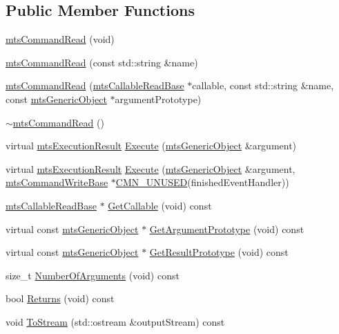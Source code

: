 \subsection*{Public Member Functions}
\begin{DoxyCompactItemize}
\item 
\hyperlink{classmts_command_read_ab7638c37f1324419aecfd630c1956242}{mts\+Command\+Read} (void)
\item 
\hyperlink{classmts_command_read_a3284698af9e589017a99d01c106d134f}{mts\+Command\+Read} (const std\+::string \&name)
\item 
\hyperlink{classmts_command_read_ad1fd48cbf7eef09ec6b6ac949cf07266}{mts\+Command\+Read} (\hyperlink{classmts_callable_read_base}{mts\+Callable\+Read\+Base} $\ast$callable, const std\+::string \&name, const \hyperlink{classmts_generic_object}{mts\+Generic\+Object} $\ast$argument\+Prototype)
\item 
\hyperlink{classmts_command_read_a0bec5b8aab94dc7bc4bd0334592b773a}{$\sim$mts\+Command\+Read} ()
\item 
virtual \hyperlink{classmts_execution_result}{mts\+Execution\+Result} \hyperlink{classmts_command_read_ac7186f6e12418c551c483105719a8a38}{Execute} (\hyperlink{classmts_generic_object}{mts\+Generic\+Object} \&argument)
\item 
virtual \hyperlink{classmts_execution_result}{mts\+Execution\+Result} \hyperlink{classmts_command_read_ae5df5d5a093d4c465b3a6d3092755305}{Execute} (\hyperlink{classmts_generic_object}{mts\+Generic\+Object} \&argument, \hyperlink{classmts_command_write_base}{mts\+Command\+Write\+Base} $\ast$\hyperlink{cmn_portability_8h_a021894e2626935fa2305434b1e893ff6}{C\+M\+N\+\_\+\+U\+N\+U\+S\+E\+D}(finished\+Event\+Handler))
\item 
\hyperlink{classmts_callable_read_base}{mts\+Callable\+Read\+Base} $\ast$ \hyperlink{classmts_command_read_a0787cf1a8fa82d5bef0e904fce8a1b94}{Get\+Callable} (void) const 
\item 
virtual const \hyperlink{classmts_generic_object}{mts\+Generic\+Object} $\ast$ \hyperlink{classmts_command_read_af68b3e7a6e6a32759affbbd6a6715a72}{Get\+Argument\+Prototype} (void) const 
\item 
virtual const \hyperlink{classmts_generic_object}{mts\+Generic\+Object} $\ast$ \hyperlink{classmts_command_read_a799a502c2c5bfa07a1eb65bd69c72ed7}{Get\+Result\+Prototype} (void) const 
\item 
size\+\_\+t \hyperlink{classmts_command_read_ae3cd3d0b3aded18cc412ba2727ba1d65}{Number\+Of\+Arguments} (void) const 
\item 
bool \hyperlink{classmts_command_read_a375ea296870810376b01474297efff64}{Returns} (void) const 
\item 
void \hyperlink{classmts_command_read_a7790e415f816894d2a97ba1358848f19}{To\+Stream} (std\+::ostream \&output\+Stream) const 
\end{DoxyCompactItemize}
